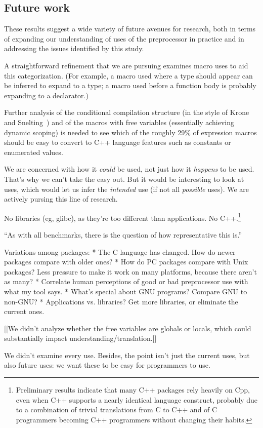 \documentclass[10pt]{article}
\newcommand{\pkg}[1]{\textsf{#1}}
\begin{document}
\subsection{Future work}
 
These results suggest a wide variety of future avenues for research, both
in terms of expanding our understanding of uses of the preprocessor in
practice and in addressing the issues identified by this study.

A straightforward refinement that we are pursuing examines macro uses to
aid this categorization.  (For example, a macro used where a type should
appear can be inferred to expand to a type; a macro used before a function
body is probably expanding to a declarator.)

Further analysis of the conditional
compilation structure (in the style of Krone and Snelting~\cite{Krone94})
and of the macros with free variables (essentially achieving dynamic
scoping) is needed to see which of the roughly 29\% of expression macros
should be easy to convert to C++ language features such as constants or
enumerated values.

  We are concerned with how it {\em could} be used, not just how it {\em
  happens} to be used.  That's why we can't take the easy out.  But it
  would be interesting to look at uses, which would let us infer the {\em
  intended} use (if not all {\em possible} uses).  We are actively pursing
  this line of research.


No libraries (eg, \pkg{glibc}), as they're too different than applications.
No C++.\footnote{Preliminary results indicate that many
  C++ packages rely heavily on Cpp, even when C++ supports a nearly
  identical language construct, probably due to a combination of trivial
  translations from C to C++ and of C programmers becoming C++ programmers
  without changing their habits.}

``As with all benchmarks, there is the question of how representative this is.''

Variations among packages:
 * The C language has changed.  How do newer packages compare with older ones?
 * How do PC packages compare with Unix packages?  Less pressure to make it
   work on many platforms, because there aren't as many?
 * Correlate human perceptions of good or bad preprocessor use with what my
   tool says.
 * What's special about GNU programs?  Compare GNU to non-GNU?
 * Applications vs. libraries?  Get more libraries, or eliminate the current
   ones.


  [[We didn't analyze whether the free variables are globals or locals,
          which could substantially impact understanding/translation.]]

        We didn't examine every use.  Besides, the point isn't just the
          current uses, but also future uses:  we want these to be easy for
          programmers to use.


{\small }
\end{document}
